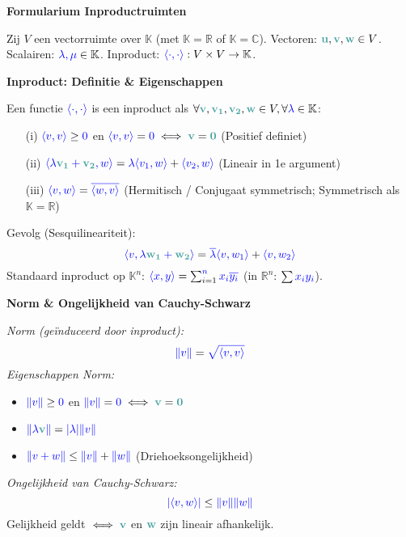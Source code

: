 \documentclass[12pt]{article}
\renewcommand{\vec}[1]{\textcolor{vectorTeal}{\mathbf{#1}}}
\newcommand{\scalar}[1]{\textcolor{scalarBrightBlue}{#1}}
\newcommand{\field}[1]{\mathbb{#1}}
\newcommand{\innerprod}[2]{\scalar{\langle #1, #2 \rangle}}
\newcommand{\norm}[1]{\scalar{\| #1 \|}}
\begin{document}
\begin{center}
\Large \textbf{Formularium Inproductruimten}
\end{center}

\vspace{1em} %

Zij $V$ een vectorruimte over $\field{K}$ (met $\field{K} = \field{R}$ of $\field{K} = \field{C}$).
Vectoren: $\vec{u}, \vec{v}, \vec{w} \in V$. Scalairen: $\scalar{\lambda, \mu} \in \field{K}$.
Inproduct: $\innerprod{\cdot}{\cdot}: V \times V \to \field{K}$.

\vspace{1.5em} %
{\centering
\textcolor{headerBrown}{\large\textbf{Inproduct: Definitie \& Eigenschappen}}
\par
}%
Een functie $\innerprod{\cdot}{\cdot}$ is een inproduct als $\forall \vec{v}, \vec{v_1}, \vec{v_2}, \vec{w} \in V, \forall \scalar{\lambda} \in \field{K}$:
\begin{itemize}
    \item[(i)] $\innerprod{v}{v} \ge \scalar{0}$ \quad en \quad $\innerprod{v}{v} = \scalar{0} \iff \vec{v} = \vec{0}$ \quad (Positief definiet)
    \item[(ii)] $\innerprod{\scalar{\lambda}\vec{v_1} + \vec{v_2}}{w} = \scalar{\lambda}\innerprod{v_1}{w} + \innerprod{v_2}{w}$ \quad (Lineair in 1e argument)
    \item[(iii)] $\innerprod{v}{w} = \scalar{\overline{\innerprod{w}{v}}}$ \quad (Hermitisch / Conjugaat symmetrisch; Symmetrisch als $\field{K}=\field{R}$)
\end{itemize}
Gevolg (Sesquilineariteit):
\[
\innerprod{v}{\scalar{\lambda}\vec{w_1} + \vec{w_2}} = \scalar{\overline{\lambda}} \innerprod{v}{w_1} + \innerprod{v}{w_2}
\]
Standaard inproduct op $\field{K}^n$: $\innerprod{x}{y} = \sum_{i=1}^{\scalar{n}} \scalar{x_i \overline{y_i}}$ (in $\field{R}^n$: $\sum \scalar{x_i y_i}$).

\vspace{1.5em} %
{\centering
\textcolor{headerBrown}{\large\textbf{Norm & Ongelijkheid van Cauchy-Schwarz}}
\par
}%
\textit{Norm (geïnduceerd door inproduct):}
\[
\norm{v} = \scalar{\sqrt{\innerprod{v}{v}}}
\]
\textit{Eigenschappen Norm:}
\begin{itemize}
    \item $\norm{v} \ge \scalar{0}$ en $\norm{v} = \scalar{0} \iff \vec{v} = \vec{0}$
    \item $\norm{\scalar{\lambda} \vec{v}} = \scalar{|\lambda|} \norm{v}$
    \item $\norm{v + w} \le \norm{v} + \norm{w}$ (Driehoeksongelijkheid)
\end{itemize}
\textit{Ongelijkheid van Cauchy-Schwarz:}
\[
\scalar{|\innerprod{v}{w}|} \le \norm{v} \norm{w}
\]
Gelijkheid geldt $\iff \vec{v}$ en $\vec{w}$ zijn lineair afhankelijk.
\end{document}
